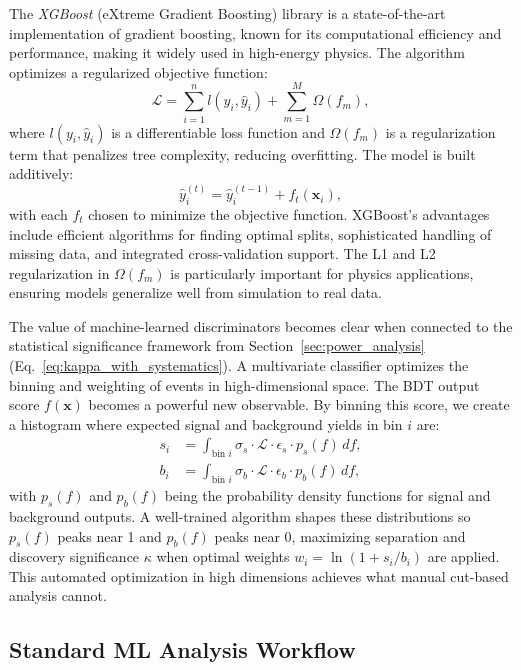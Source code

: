 The \textit{XGBoost} (eXtreme Gradient Boosting) library is a state-of-the-art implementation of gradient boosting, known for its computational efficiency and performance, making it widely used in high-energy physics. The algorithm optimizes a regularized objective function:
\begin{equation}
\mathcal{L} = \sum_{i=1}^{n} l(y_i, \hat{y}_i) + \sum_{m=1}^{M} \Omega(f_m),
\end{equation}
where $l(y_i, \hat{y}_i)$ is a differentiable loss function and $\Omega(f_m)$ is a regularization term that penalizes tree complexity, reducing overfitting. The model is built additively:
\begin{equation}
\hat{y}_i^{(t)} = \hat{y}_i^{(t-1)} + f_t(\mathbf{x}_i),
\end{equation}
with each $f_t$ chosen to minimize the objective function. XGBoost's advantages include efficient algorithms for finding optimal splits, sophisticated handling of missing data, and integrated cross-validation support. The L1 and L2 regularization in $\Omega(f_m)$ is particularly important for physics applications, ensuring models generalize well from simulation to real data.

The value of machine-learned discriminators becomes clear when connected to the statistical significance framework from Section~\ref{sec:power_analysis} (Eq.~\ref{eq:kappa_with_systematics}). A multivariate classifier optimizes the binning and weighting of events in high-dimensional space. The BDT output score $f(\mathbf{x})$ becomes a powerful new observable. By binning this score, we create a histogram where expected signal and background yields in bin $i$ are:
\begin{align}
s_i &= \int_{\text{bin } i} \sigma_s \cdot \mathcal{L} \cdot \epsilon_s \cdot p_s(f) \, df, \\
b_i &= \int_{\text{bin } i} \sigma_b \cdot \mathcal{L} \cdot \epsilon_b \cdot p_b(f) \, df,
\end{align}
with $p_s(f)$ and $p_b(f)$ being the probability density functions for signal and background outputs. A well-trained algorithm shapes these distributions so $p_s(f)$ peaks near 1 and $p_b(f)$ peaks near 0, maximizing separation and discovery significance $\kappa$ when optimal weights $w_i = \ln(1 + s_i/b_i)$ are applied. This automated optimization in high dimensions achieves what manual cut-based analysis cannot.

\subsection{Standard ML Analysis Workflow}
\label{ssec:ml_workflow}

